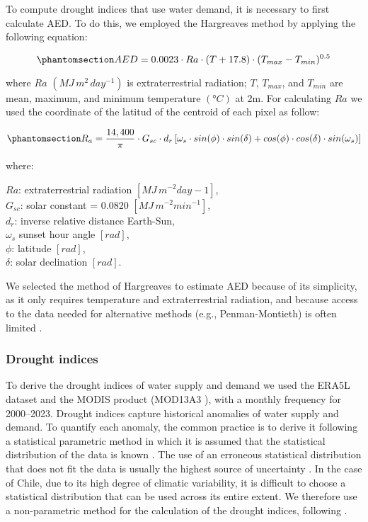 \documentclass[
  sn-nature,
  numbered]{sn-jnl}
\begin{document}
To compute drought indices that use water demand, it is necessary to
first calculate AED. To do this, we employed the Hargreaves method
\citep{Hargreaves1994, Hargreaves1985} by applying the following
equation:

\begin{equation}\phantomsection\label{eq-AED}{AED = 0.0023\cdot Ra\cdot (T+17.8)\cdot (T_{max}-T_{min})^{0.5}}\end{equation}

where \(Ra\) \((MJ\,m^2\, day^{-1})\) is extraterrestrial radiation;
\(T\), \(T_{max}\), and \(T_{min}\) are mean, maximum, and minimum
temperature \((°C)\) at 2m. For calculating \(Ra\) we used the
coordinate of the latitud of the centroid of each pixel as follow:

\begin{equation}\phantomsection\label{eq-Ra}{R_a = \frac{14,400}{\pi}\cdot G_{sc}\cdot d_r \left[\omega_s\cdot sin(\phi)\cdot sin(\delta)+cos(\phi)\cdot cos(\delta)\cdot sin(\omega_s) \right]}\end{equation}

where:

\(Ra\): extraterrestrial radiation \([MJ\, m^{-2} day-1]\),\\
\(G_{sc}\): solar constant = 0.0820 \([MJ\,m^{-2} min^{-1}]\),\\
\(d_r\): inverse relative distance Earth-Sun,\\
\(\omega_s\) sunset hour angle \([rad]\),\\
\(\phi\): latitude \([rad]\),\\
\(\delta\): solar declination \([rad]\).

We selected the method of Hargreaves to estimate AED because of its
simplicity, as it only requires temperature and extraterrestrial
radiation, and because access to the data needed for alternative methods
(e.g., Penman-Montieth) is often limited \citep{Vicente-Serrano2014}.

\subsubsection{Drought indices}\label{drought-indices}

To derive the drought indices of water supply and demand we used the
ERA5L dataset and the MODIS product (MOD13A3 \citep{Didan2015b}), with a
monthly frequency for 2000--2023. Drought indices capture historical
anomalies of water supply and demand. To quantify each anomaly, the
common practice is to derive it following a statistical parametric
method in which it is assumed that the statistical distribution of the
data is known \citep{Heim2002}. The use of an erroneous statistical
distribution that does not fit the data is usually the highest source of
uncertainty \citep{Laimighofer2022}. In the case of Chile, due to its
high degree of climatic variability, it is difficult to choose a
statistical distribution that can be used across its entire extent. We
therefore use a non-parametric method for the calculation of the drought
indices, following \citep{Farahmand2015}.
\end{document}
